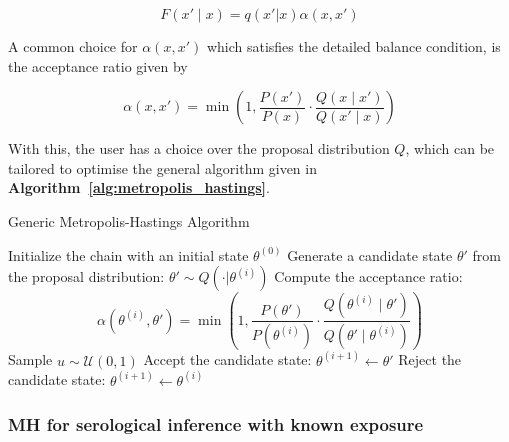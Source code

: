 \begin{equation}
F(x' \mid x) = q(x' | x)\alpha(x, x')
\end{equation}

A common choice for $\alpha(x, x')$ which satisfies the detailed balance condition, is the acceptance ratio given by 

\begin{equation}
\label{eq:alpha}
        \alpha(x, x') = \min\left(1, \frac{P(x')}{P(x)} \cdot \frac{Q(x \mid x')}{Q(x' \mid x)}\right)
 \end{equation}

With this, the user has a choice over the proposal distribution $Q$, which can be tailored to optimise the general algorithm given in \textbf{Algorithm~\ref{alg:metropolis_hastings}}.

\begin{algorithm}[H]
\caption{Generic Metropolis-Hastings Algorithm}
\label{alg:metropolis_hastings}
\begin{algorithmic}[1]
    \State Initialize the chain with an initial state $\theta^{(0)}$
        \State Generate a candidate state $\theta'$ from the proposal distribution: $\theta' \sim Q(\cdot | \theta^{(i)})$
        \State Compute the acceptance ratio:
        \[
        \alpha(\theta^{(i)}, \theta') = \min\left(1, \frac{P(\theta')}{P(\theta^{(i)})} \cdot \frac{Q(\theta^{(i)} \mid \theta')}{Q(\theta' \mid \theta^{(i)})}\right)
        \]
        \State Sample $u \sim \mathcal{U}(0, 1)$
            \State Accept the candidate state: $\theta^{(i+1)} \leftarrow \theta'$
        \Else
            \State Reject the candidate state: $\theta^{(i+1)} \leftarrow \theta^{(i)}$
        \EndIf
    \EndFor
\end{algorithmic}
\end{algorithm}



\subsubsection{MH for serological inference with known exposure }

